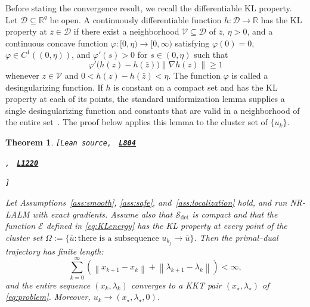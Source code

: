 \documentclass[11pt]{article}
\newtheorem{theorem}{Theorem}[section]
\theoremstyle{definition}
\theoremstyle{remark}
\numberwithin{equation}{section}
\numberwithin{figure}{section}
\numberwithin{table}{section}
\numberwithin{algorithm}{section}
\newcommand{\R}{\mathbb{R}}
\newcommand{\norm}[1]{\left\lVert #1\right\rVert}
\newcommand{\grad}{\nabla}
\newcommand{\leanLinkText}[1]{%
  \underline{\textbf{#1}}%
}
\newcommand{\leanDeclTag}[2]{%
  {\footnotesize\texttt{[Lean source, }}%
  \href{https://github.com/optpku/ReasBook/blob/v4.32.2/ReasBook/Papers/TR_LALM_theory/#1?plain=1\#L#2}%
    {\leanLinkText{\footnotesize\texttt{L#2}}}%
}
\newcommand{\leanDeclTagExtra}[2]{%
  \unskip
  {\footnotesize\texttt{, }}%
  \href{https://github.com/optpku/ReasBook/blob/v4.32.2/ReasBook/Papers/TR_LALM_theory/#1?plain=1\#L#2}%
    {\leanLinkText{\footnotesize\texttt{L#2}}}\allowbreak
}
\newcommand{\leanDeclTagEnd}{%
  \unskip
  {\footnotesize\texttt{]}}\enspace
}
\begin{document}
Before stating the convergence result, we recall the differentiable KL property.  Let $\mathcal D\subseteq\R^q$ be open.  A continuously
differentiable function $h:\mathcal D\to\R$ has the KL property at
$\bar z\in\mathcal D$ if there exist a neighborhood $\mathcal V\subseteq\mathcal D$ of $\bar z$, $\eta>0$, and a continuous
concave function $\varphi:[0,\eta)\to[0,\infty)$ satisfying
$\varphi(0)=0$, $\varphi\in C^1((0,\eta))$, and $\varphi'(s)>0$ for $s\in(0,\eta)$ such that
$$
    \varphi'\bigl(h(z)-h(\bar z)\bigr)\norm{\grad h(z)}\geq1
$$
whenever $z\in\mathcal V$ and $0<h(z)-h(\bar z)<\eta$.  The function
$\varphi$ is called a desingularizing function.  If $h$ is constant on a compact set and has the KL property at each of its points, the standard uniformization lemma supplies a single desingularizing function and constants that are valid in a neighborhood of the entire set~\cite{AttouchBolteSvaiter2013}.  The proof below applies this lemma to the cluster set of $\{u_k\}$.


\begin{theorem}
\label{thm:KL}
\leanDeclTag{Theorem_2_13.lean}{804}
\leanDeclTagExtra{Theorem_2_13.lean}{1220}
\leanDeclTagEnd
Let Assumptions~\ref{ass:smooth}, \ref{ass:safe}, and~\ref{ass:localization}
hold, and run NR-LALM with
exact gradients.  Assume also that
\(\mathcal S_{\mathrm{det}}\) is compact
and that the function \(\mathcal E\) defined in \eqref{eq:KLenergy} has the
KL property at every point of the cluster set
\(\Omega:=\{\bar u:\text{there is a subsequence }u_{k_j}\to\bar u\}\).
Then the primal--dual trajectory has finite length:
\begin{equation}
 \sum_{k=0}^{\infty}
 \left(\norm{x_{k+1}-x_k}
       +\norm{\lambda_{k+1}-\lambda_k}\right)<\infty,
 \label{eq:KLoriginallength}
\end{equation}
and the entire sequence $(x_k,\lambda_k)$ converges to a KKT pair
$(x_\star,\lambda_\star)$ of \eqref{eq:problem}.  Moreover,
$u_k\to(x_\star,\lambda_\star,0)$.
\end{theorem}
\end{document}
